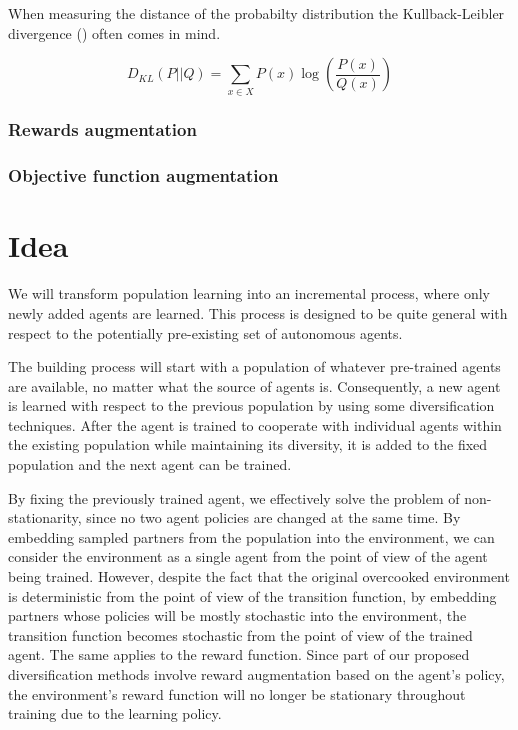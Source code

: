 When measuring the distance of the probabilty distribution the Kullback-Leibler divergence (\cite{KLDivergence}) often comes in mind.

\[
    D_{KL}(P||Q) = \sum_{x \in X}P(x)\log\left(\frac{P(x)}{Q(x)}\right)
\]


\subsubsection{Rewards augmentation}
\subsubsection{Objective function augmentation}




\section{Idea}


We will transform population learning into an incremental process, where only newly added agents are learned.
This process is designed to be quite general with respect to the potentially pre-existing set of autonomous agents.

The building process will start with a population of whatever pre-trained agents are available, no matter what the source of agents is.
Consequently, a new agent is learned with respect to the previous population by using some diversification techniques.
After the agent is trained to cooperate with individual agents within the existing population while maintaining its diversity, it is added to the fixed population and the next agent can be trained.

By fixing the previously trained agent, we effectively solve the problem of non-stationarity, since no two agent policies are changed at the same time.
By embedding sampled partners from the population into the environment, we can consider the environment as a single agent from the point of view of the agent being trained.
However, despite the fact that the original overcooked environment is deterministic from the point of view of the transition function, by embedding partners whose policies will be mostly stochastic into the environment, the transition function becomes stochastic from the point of view of the trained agent.
The same applies to the reward function.
Since part of our proposed diversification methods involve reward augmentation based on the agent's policy, the environment's reward function will no longer be stationary throughout training due to the learning policy.

